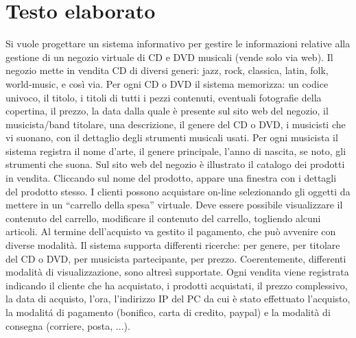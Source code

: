 \documentclass[a4paper,titlepage]{book}
\begin{document}
\pagestyle{plain}

\begin{frontespizio}
\end{frontespizio}

\frontmatter
\tableofcontents

\mainmatter
\chapter{Testo elaborato}
Si vuole progettare un sistema informativo per gestire le informazioni relative alla gestione di un negozio
virtuale di CD e DVD musicali (vende solo via web).
Il negozio mette in vendita CD di diversi generi: jazz, rock, classica, latin, folk, world-music, e cos\`i via.
Per ogni CD o DVD il sistema memorizza: un codice univoco, il titolo, i titoli di tutti i pezzi contenuti,
eventuali fotografie della copertina, il prezzo, la data dalla quale \`e presente sul sito web del negozio, il
musicista/band titolare, una descrizione, il genere del CD o DVD, i musicisti che vi suonano, con il
dettaglio degli strumenti musicali usati. Per ogni musicista il sistema registra il nome d’arte, il genere
principale, l’anno di nascita, se noto, gli strumenti che suona.
Sul sito web del negozio \`e illustrato il catalogo dei prodotti in vendita.
Cliccando sul nome del prodotto, appare una finestra con i dettagli del prodotto stesso.
I clienti possono acquistare on-line selezionando gli oggetti da mettere in un “carrello della spesa”
virtuale.
Deve essere possibile visualizzare il contenuto del carrello, modificare il contenuto del carrello, togliendo
alcuni articoli.
Al termine dell’acquisto va gestito il pagamento, che pu\`o avvenire con diverse modalit\`a.
Il sistema supporta differenti ricerche: per genere, per titolare del CD o DVD, per musicista partecipante,
per prezzo. Coerentemente, differenti modalit\`a di visualizzazione, sono altres\`i supportate.
Ogni vendita viene registrata indicando il cliente che ha acquistato, i prodotti acquistati, il prezzo
complessivo, la data di acquisto, l’ora, l’indirizzo IP del PC da cui \`e stato effettuato l’acquisto, la modalit\'a
di pagamento (bonifico, carta di credito, paypal) e la modalit\`a di consegna (corriere, posta, ...).
\end{document}

